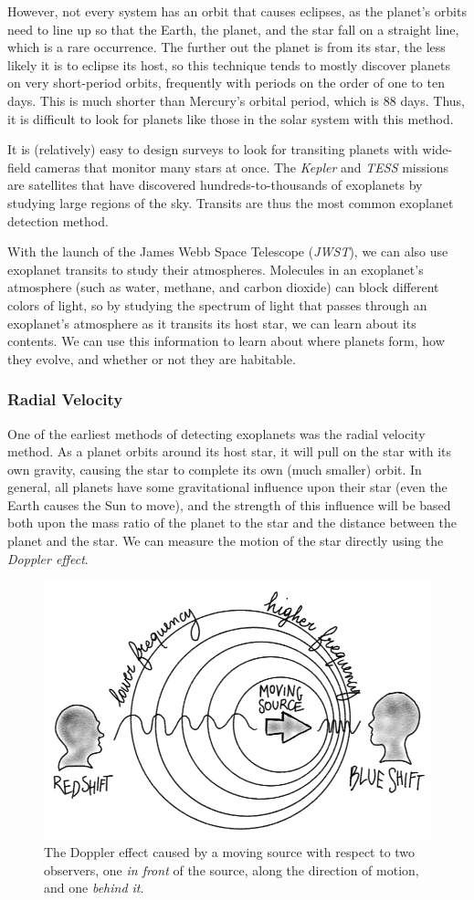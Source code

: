 However, not every system has an orbit that causes eclipses, as the planet’s orbits need to line up so that the Earth, the planet, and the star fall on a straight line, which is a rare occurrence.  The further out the planet is from its star, the less likely it is to eclipse its host, so this technique tends to mostly discover planets on very short-period orbits, frequently with periods on the order of one to ten days.  This is much shorter than Mercury’s orbital period, which is 88 days.  Thus, it is difficult to look for planets like those in the solar system with this method.

It is (relatively) easy to design surveys to look for transiting planets with wide-field cameras that monitor many stars at once.  The \textit{Kepler} and \textit{TESS} missions are satellites that have discovered hundreds-to-thousands of exoplanets by studying large regions of the sky.  Transits are thus the most common exoplanet detection method.

With the launch of the James Webb Space Telescope (\textit{JWST}), we can also use exoplanet transits to study their atmospheres.  Molecules in an exoplanet’s atmosphere (such as water, methane, and carbon dioxide) can block different colors of light, so by studying the spectrum of light that passes through an exoplanet’s atmosphere as it transits its host star, we can learn about its contents.  We can use this information to learn about where planets form, how they evolve, and whether or not they are habitable.

\subsubsection{Radial Velocity}

One of the earliest methods of detecting exoplanets was the radial velocity method.  As a planet orbits around its host star, it will pull on the star with its own gravity, causing the star to complete its own (much smaller) orbit.  In general, all planets have some gravitational influence upon their star (even the Earth causes the Sun to move), and the strength of this influence will be based both upon the mass ratio of the planet to the star and the distance between the planet and the star.  We can measure the motion of the star directly using the \textit{Doppler effect}.


\begin{figure}[h!]
    \centering
    \includegraphics[width=0.5\linewidth]{img/Doppler.png}
    \caption{The Doppler effect caused by a moving source with respect to two observers, one \textit{in front} of the source, along the direction of motion, and one \textit{behind it}.}
    \label{fig:Doppler}
\end{figure}


